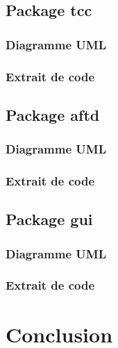 \documentclass[11pt]{report}
\begin{document}
	\section{Package tcc}
		\subsection{Diagramme UML}
		\subsection{Extrait de code}
		
	\section{Package aftd}
		\subsection{Diagramme UML}
		\subsection{Extrait de code}
		
	\section{Package gui}
		\subsection{Diagramme UML}
		\subsection{Extrait de code}

\chapter{Conclusion}
		
		
\end{document}
